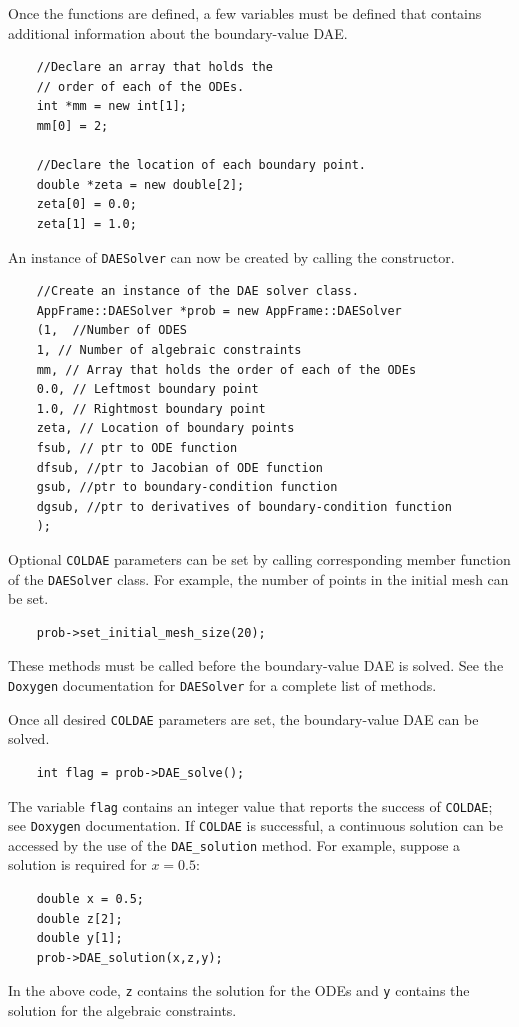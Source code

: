 Once the functions are defined, a few  variables must be defined that contains additional information about the boundary-value DAE.
\begin{lstlisting}
	//Declare an array that holds the 
	// order of each of the ODEs.
	int *mm = new int[1];
	mm[0] = 2;

	//Declare the location of each boundary point.
	double *zeta = new double[2];
	zeta[0] = 0.0;
	zeta[1] = 1.0;
\end{lstlisting} 

An instance of \texttt{DAESolver} can now be created by calling the constructor.
\begin{lstlisting}
	//Create an instance of the DAE solver class.  
	AppFrame::DAESolver *prob = new AppFrame::DAESolver
	(1,  //Number of ODES
	1, // Number of algebraic constraints
	mm, // Array that holds the order of each of the ODEs
	0.0, // Leftmost boundary point
	1.0, // Rightmost boundary point
	zeta, // Location of boundary points
	fsub, // ptr to ODE function
	dfsub, //ptr to Jacobian of ODE function
	gsub, //ptr to boundary-condition function
	dgsub, //ptr to derivatives of boundary-condition function
	);
\end{lstlisting}

Optional \texttt{COLDAE} parameters can be set by calling corresponding member function of the \texttt{DAESolver} class.  For example, the number of points in the initial mesh can be set.
\begin{lstlisting}
	prob->set_initial_mesh_size(20);
\end{lstlisting}
These methods must be called before the boundary-value DAE is solved.  See the \texttt{Doxygen} documentation for \texttt{DAESolver} for a complete list of methods.

Once all desired \texttt{COLDAE} parameters are set, the boundary-value DAE can be solved.
\begin{lstlisting}
	int flag = prob->DAE_solve();
\end{lstlisting}
The variable \texttt{flag} contains an integer value that reports the success of \texttt{COLDAE}; see \texttt{Doxygen} documentation.  If \texttt{COLDAE} is successful, a continuous solution can be accessed by the use of the \texttt{DAE\_solution} method.  For example, suppose a solution is required for $x=0.5$:
\begin{lstlisting}
	double x = 0.5; 
	double z[2];
	double y[1];
	prob->DAE_solution(x,z,y);
\end{lstlisting} 
In the above code, \texttt{z} contains the solution for the ODEs and \texttt{y} contains the solution for the algebraic constraints. 

